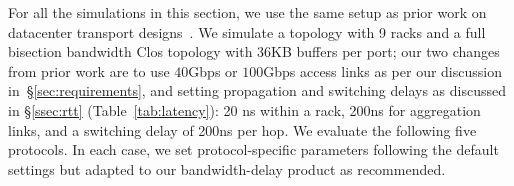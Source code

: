 



    

%

For all the simulations in this section, we use the same setup as prior work on datacenter transport designs~\cite{pfabric, phost}. 
We simulate a %
topology with 9 racks and a full bisection bandwidth Clos topology with $36$KB buffers per port; our two changes from prior work are to use $40$Gbps or $100$Gbps access links as per our discussion in~\S\ref{sec:requirements}, and setting propagation and switching delays as discussed in \S\ref{ssec:rtt} (Table~\ref{tab:latency}): 20 ns within a rack, 200ns for aggregation links, and a switching delay of 200ns per hop. 
We evaluate the following five protocols. 
In each case, we set protocol-specific parameters following the default settings but adapted to our bandwidth-delay product as recommended. 


